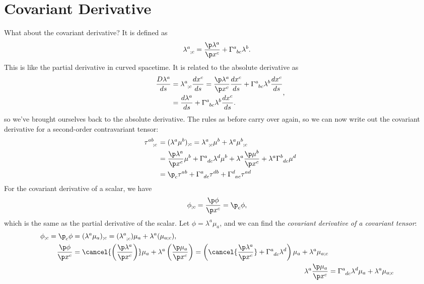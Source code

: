 \documentclass[a4paper, 11pt, normalem]{report}
\begin{document}
\section{Covariant Derivative}
What about the covariant derivative?
It is defined as
\begin{align}
    \tensor{\lambda}{^a_{;c}} &= \frac{\p\lambda^a}{\p x^c} + \tensor{\Gamma}{^a_{bc}}\lambda^b.
\end{align}
This is like the partial derivative in curved spacetime. 
It is related to the absolute derivative as
\begin{align}
    \begin{split}
        \frac{D\lambda^a}{ds} &= \tensor{\lambda}{^a_{;c}}\frac{dx^c}{ds} = \frac{\p\lambda^a}{\p x^c}\frac{dx^c}{ds} + \tensor{\Gamma}{^a_{bc}}\lambda^b\frac{dx^c}{ds}\\
                              &= \frac{d\lambda^a}{ds} + \tensor{\Gamma}{^a_{bc}}\lambda^b\frac{dx^c}{ds}.
    \end{split},
\end{align}
so we've brought ourselves back to the absolute derivative. 
The rules as before carry over again, so we can now write out the covariant derivative for a second-order contravariant tensor:
\begin{align}
    \begin{split}
        \tensor{\tau}{^{ab}_{;c}} &= (\lambda^a\mu^b)_{;c} = \tensor{\lambda}{^a_{;c}}\mu^b + \lambda^a\tensor{\mu}{^b_{;c}} \\
                                  &= \frac{\p\lambda^a}{\p x^c}\mu^b + \tensor{\Gamma}{^a_{dc}}\lambda^d\mu^b + \lambda^a\frac{\p\mu^b}{\p x^c} + \lambda^a\tensor{\Gamma}{^b_{dc}}\mu^d \\
                                  &= \p_c\tau^{ab} + \tensor{\Gamma}{^a_{dc}}\tau^{db} + \tensor{\Gamma}{^d_{ac}}\tau^{ad}
    \end{split}
\end{align}
For the covariant derivative of a scalar, we have
\begin{align}
    \phi_{;c} &= \frac{\p\phi}{\p x^c} = \p_c\phi,
\end{align}
which is the same as the partial derivative of the scalar. 
Let $\phi=\lambda^a\mu_a$, and we can find the \emph{covariant derivative of a covariant tensor}:
\begin{align}
    \begin{split}
        \phi_{;c} = \p_c\phi &= (\lambda^a\mu_a)_{;c} = (\tensor{\lambda}{^a_{;c}})\mu_a + \lambda^a(\mu_{a;c}), \\
        \frac{\p\phi}{\p x^c} &= \cancel{\left(\frac{\p\lambda^a}{\p x^c}\right)}\mu_a + \lambda^a\left(\frac{\p\mu_a}{\p x^c}\right) = \left(\cancel{\frac{\p\lambda^a}{\p x^c}} + \tensor{\Gamma}{^a_{dc}}\lambda^d\right)\mu_a + \lambda^a\mu_{a;c} 
    \end{split}\\
    \lambda^a\frac{\p\mu_a}{\p x^c} &= \tensor{\Gamma}{^a_{dc}}\lambda^d\mu_a + \lambda^a\mu_{a;c}
\end{align}
\end{document}

